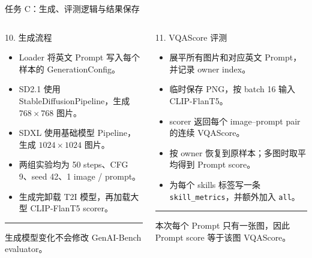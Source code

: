 \documentclass[aspectratio=169,10pt]{beamer}
\begin{document}
\begin{frame}{任务 C：生成、评测逻辑与结果保存}
  \begin{columns}[T,onlytextwidth]
      \begin{block}{10. 生成流程}
        \begin{minipage}[c][5.05cm][c]{\linewidth}
          \begin{itemize}\scriptsize
            \item Loader 将英文 Prompt 写入每个样本的 GenerationConfig。
            \item SD2.1 使用 StableDiffusionPipeline，生成 $768\times768$ 图片。
            \item SDXL 使用基础模型 Pipeline，生成 $1024\times1024$ 图片。
            \item 两组实验均为 50 steps、CFG 9、seed 42、1 image / prompt。
            \item 生成完卸载 T2I 模型，再加载大型 CLIP-FlanT5 scorer。
          \end{itemize}
          \vspace{0.45em}
          \color{T2IGray}\rule{\linewidth}{0.35pt}\par\vspace{0.3em}
          \scriptsize 生成模型变化不会修改 GenAI-Bench evaluator。
        \end{minipage}
      \end{block}

      \begin{block}{11. VQAScore 评测}
        \begin{minipage}[c][5.05cm][c]{\linewidth}
          \begin{itemize}\scriptsize
            \item 展平所有图片和对应英文 Prompt，并记录 owner index。
            \item 临时保存 PNG，按 batch 16 输入 CLIP-FlanT5。
            \item scorer 返回每个 image--prompt pair 的连续 VQAScore。
            \item 按 owner 恢复到原样本；多图时取平均得到 Prompt score。
            \item 为每个 skills 标签写一条 \texttt{skill\_metrics}，并额外加入 \texttt{all}。
          \end{itemize}
          \vspace{0.45em}
          \color{T2IGray}\rule{\linewidth}{0.35pt}\par\vspace{0.3em}
          \scriptsize 本次每个 Prompt 只有一张图，因此 Prompt score 等于该图 VQAScore。
        \end{minipage}
      \end{block}


\end{columns}
\end{frame}
\end{document}
